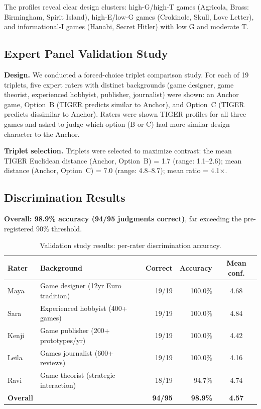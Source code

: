 The profiles reveal clear design clusters:
high-G/high-T games (Agricola, Brass: Birmingham, Spirit Island),
high-E/low-G games (Crokinole, Skull, Love Letter),
and informational-I games (Hanabi, Secret Hitler) with low G and moderate T.

\subsection{Expert Panel Validation Study}

\textbf{Design.} We conducted a forced-choice triplet comparison study.
For each of 19 triplets, five expert raters with distinct backgrounds
(game designer, game theorist, experienced hobbyist, publisher, journalist)
were shown: an Anchor game, Option~B (TIGER predicts similar to Anchor),
and Option~C (TIGER predicts dissimilar to Anchor). Raters were shown
TIGER profiles for all three games and asked to judge which option (B or C)
had more similar design character to the Anchor.

\textbf{Triplet selection.} Triplets were selected to maximize contrast:
the mean TIGER Euclidean distance (Anchor, Option~B) = 1.7 (range: 1.1--2.6);
mean distance (Anchor, Option~C) = 7.0 (range: 4.8--8.7);
mean ratio = 4.1$\times$.

\subsection{Discrimination Results}

\textbf{Overall: 98.9\% accuracy (94/95 judgments correct)}, far exceeding
the pre-registered 90\% threshold.

\begin{table}[ht]
\centering
\caption{Validation study results: per-rater discrimination accuracy.}
\label{tab:validation}
\begin{tabular}{llrrc}
\toprule
\textbf{Rater} & \textbf{Background} & \textbf{Correct} & \textbf{Accuracy} & \textbf{Mean conf.} \\
\midrule
Maya   & Game designer (12yr Euro tradition) & 19/19 & 100.0\% & 4.68 \\
Sara   & Experienced hobbyist (400+ games)   & 19/19 & 100.0\% & 4.84 \\
Kenji  & Game publisher (200+ prototypes/yr) & 19/19 & 100.0\% & 4.42 \\
Leila  & Games journalist (600+ reviews)     & 19/19 & 100.0\% & 4.16 \\
Ravi   & Game theorist (strategic interaction) & 18/19 & 94.7\%  & 4.74 \\
\midrule
\textbf{Overall} & & \textbf{94/95} & \textbf{98.9\%} & \textbf{4.57} \\
\bottomrule
\end{tabular}
\end{table}

